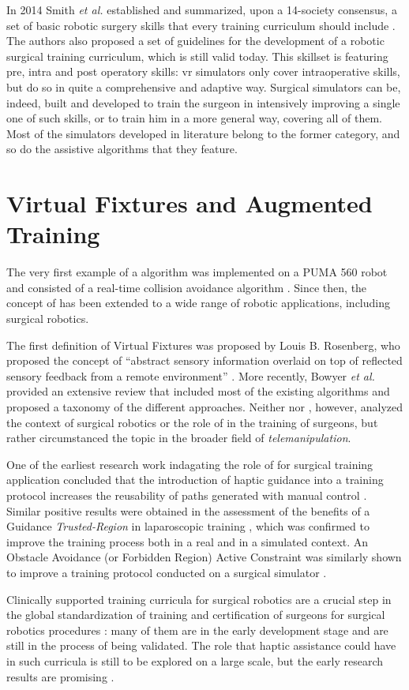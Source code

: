 \documentclass[../main.tex]{subfiles}
\begin{document}
In 2014 Smith \textit{et al.} established and summarized, upon a 14-society consensus, a set of basic robotic surgery skills that every training curriculum should include \cite{Smith2014}. 
The authors also proposed a set of guidelines for the development of a robotic surgical training curriculum, which is still valid today. This skillset is featuring pre, intra and post operatory skills: \ac{vr} simulators only cover intraoperative skills, but do so in quite a comprehensive and adaptive way. Surgical simulators can be, indeed, built and developed to train the surgeon in intensively improving a single one of such skills, or to train him in a more general way, covering all of them. Most of the \vr simulators developed in literature belong to the former category, and so do the assistive algorithms that they feature.

\section{Virtual Fixtures and Augmented Training}
The very first example of a \vf algorithm was implemented on a PUMA 560 robot and consisted of a real-time collision avoidance algorithm \cite{Khatib1986}. Since then, the concept of \vf has been extended to a wide range of robotic applications, including surgical robotics. 

The first definition of Virtual Fixtures was proposed by Louis B. Rosenberg, who proposed the concept of ``abstract sensory information overlaid on top of reflected sensory feedback from a remote environment'' \cite{Rosenberg1993}. More recently, Bowyer \textit{et al.} \cite{Bowyer2014} provided an extensive review that included most of the existing \vf algorithms and proposed a taxonomy of the different approaches. Neither \cite{Rosenberg1993} nor \cite{Bowyer2014}, however, analyzed the context of surgical robotics or the role of \vf in the training of surgeons, but rather circumstanced the topic in the broader field of \textit{telemanipulation}. 

One of the earliest research work indagating the role of \vfs for surgical training application concluded that the introduction of haptic guidance into a training protocol increases the reusability of paths generated with manual control \cite{Payandeh2002}. Similar positive results were obtained in the assessment of the benefits of a Guidance \textit{Trusted-Region} \vf in laparoscopic training \cite{Iranfar2018}, which was confirmed to improve the training process both in a real and in a simulated context. An Obstacle Avoidance (or Forbidden Region) Active Constraint was similarly shown to improve a training protocol conducted on a surgical simulator \cite{Hong2016}.

Clinically supported training curricula for surgical robotics are a crucial step in the global standardization of training and certification of surgeons for surgical robotics procedures \cite{Fisher2015}: many of them are in the early development stage and are still in the process of being validated. The role that haptic assistance could have in such curricula is still to be explored on a large scale, but the early research results are promising \cite{Van2009}.

% 
% 
\end{document}

